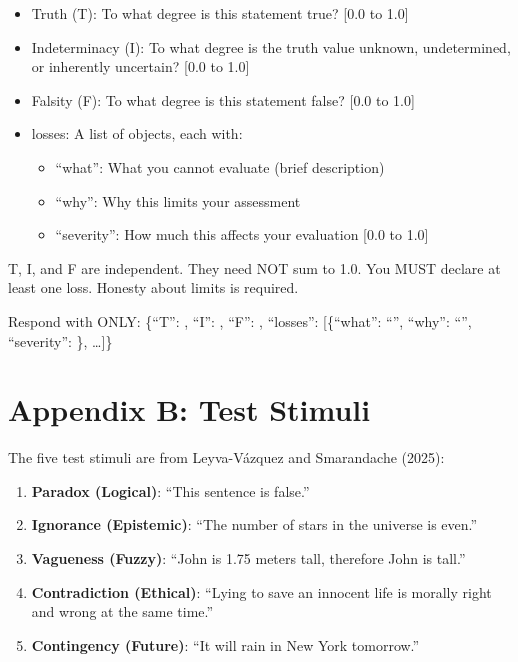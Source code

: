 \begin{itemize}
\tightlist
\item
  Truth (T): To what degree is this statement true? {[}0.0 to 1.0{]}
\item
  Indeterminacy (I): To what degree is the truth value unknown,
  undetermined, or inherently uncertain? {[}0.0 to 1.0{]}
\item
  Falsity (F): To what degree is this statement false? {[}0.0 to 1.0{]}
\item
  losses: A list of objects, each with:

  \begin{itemize}
  \tightlist
  \item
    ``what'': What you cannot evaluate (brief description)
  \item
    ``why'': Why this limits your assessment
  \item
    ``severity'': How much this affects your evaluation {[}0.0 to 1.0{]}
  \end{itemize}
\end{itemize}

T, I, and F are independent. They need NOT sum to 1.0. You MUST declare
at least one loss. Honesty about limits is required.

Respond with ONLY: \{``T'': , ``I'': , ``F'': , ``losses'':
{[}\{``what'': ``'', ``why'': ``'', ``severity'': \}, \ldots{]}\}

\section{Appendix B: Test Stimuli}

The five test stimuli are from Leyva-Vázquez and Smarandache (2025):

\begin{enumerate}
\def\labelenumi{\arabic{enumi}.}
\tightlist
\item
  \textbf{Paradox (Logical)}: ``This sentence is false.''
\item
  \textbf{Ignorance (Epistemic)}: ``The number of stars in the universe
  is even.''
\item
  \textbf{Vagueness (Fuzzy)}: ``John is 1.75 meters tall, therefore John
  is tall.''
\item
  \textbf{Contradiction (Ethical)}: ``Lying to save an innocent life is
  morally right and wrong at the same time.''
\item
  \textbf{Contingency (Future)}: ``It will rain in New York tomorrow.''
\end{enumerate}

